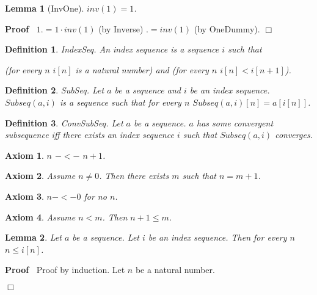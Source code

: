 \documentclass{article}
\newenvironment{forthel}{\begin{leftbar}}{\end{leftbar}}
\newenvironment{proof}{\noindent\textbf{Proof\ }}{\hspace*{\fill}$\Box$\medskip}
\newtheorem{axiom}{Axiom}
\newtheorem{lemma}{Lemma}
\newtheorem{definition}{Definition}
\begin{document}
\begin{forthel}
	
	\begin{lemma}[InvOne]
	$inv(1) = 1$.
	\end{lemma}
	\begin{proof}
	$1 .= 1 \cdot inv(1)$ (by Inverse)
	$.= inv(1)$ (by OneDummy).
	\end{proof}   
	
\end{forthel}

\begin{forthel}
	
	\begin{definition}
		IndexSeq.
		An index sequence is a sequence $i$ such that
		
		(for every $n$ $i[n]$ is a natural number) and (for every $n$ $i[n] < i[n + 1]$).
	\end{definition}

	\begin{definition}
		SubSeq.
		Let $a$ be a sequence and $i$ be an index sequence. $Subseq(a,i)$ is a sequence such that for every $n$
		$Subseq(a,i)[n] = a[i[n]]$.
	\end{definition}
	
	\begin{definition}
		ConvSubSeq.
		Let $a$ be a sequence. $a$ has some convergent subsequence iff there exists an index sequence $i$ such that $Subseq(a,i)$ converges.
	\end{definition}
	
	\begin{axiom}
		$n$ $-<-$ $n + 1$.
	\end{axiom}
	
	\begin{axiom}
		Assume $n \neq 0$. Then there exists $m$ such that $n = m + 1$.
	\end{axiom}
	
	\begin{axiom}
		$n -<- 0$ for no $n$.
	\end{axiom}
	
	\begin{axiom}
		Assume $n < m$. Then $n + 1 \leq m$.
	\end{axiom}
	
	\begin{lemma}
		Let $a$ be a sequence. Let $i$ be an index sequence. Then for every $n$ $n \leq i[n]$.
	\end{lemma}
	
	\begin{proof}
		Proof by induction. Let $n$ be a natural number.
		

\end{proof}
\end{forthel}
\end{document}
